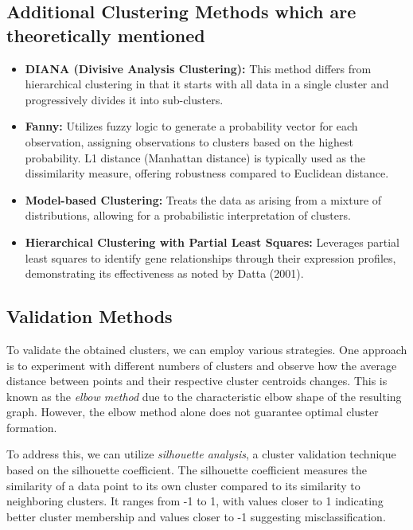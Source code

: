 \documentclass{llncs}
\begin{document}
\vspace{-30pt}

\subsection{Additional Clustering Methods which are theoretically mentioned}

\begin{itemize}
	\item \textbf{DIANA (Divisive Analysis Clustering):} This method differs from hierarchical clustering in that it starts with all data in a single cluster and progressively divides it into sub-clusters.\cite{datta2003}
	
	\item \textbf{Fanny:} Utilizes fuzzy logic to generate a probability vector for each observation, assigning observations to clusters based on the highest probability. L1 distance (Manhattan distance) is typically used as the dissimilarity measure, offering robustness compared to Euclidean distance. \cite{datta2003}
	
	\item \textbf{Model-based Clustering:} Treats the data as arising from a mixture of distributions, allowing for a probabilistic interpretation of clusters.\cite{datta2003}
	
	\item \textbf{Hierarchical Clustering with Partial Least Squares:} Leverages partial least squares to identify gene relationships through their expression profiles, demonstrating its effectiveness as noted by Datta (2001)\cite{datta2003}.
\end{itemize}

\subsection{Validation Methods}


To validate the obtained clusters, we can employ various strategies. One approach is to experiment with different numbers of clusters and observe how the average distance between points and their respective cluster centroids changes. This is known as the \textit{elbow method} due to the characteristic elbow shape of the resulting graph. However, the elbow method alone does not guarantee optimal cluster formation.

To address this, we can utilize \textit{silhouette analysis}, a cluster validation technique based on the silhouette coefficient. The silhouette coefficient measures the similarity of a data point to its own cluster compared to its similarity to neighboring clusters. It ranges from -1 to 1, with values closer to 1 indicating better cluster membership and values closer to -1 suggesting misclassification.
\end{document}
